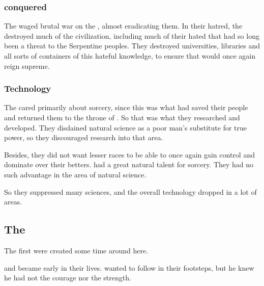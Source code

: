 \subsubsection{\Aryoth conquered}
The \dragons waged brutal war on the \aryothim, almost eradicating them. 
In their hatred, the \dragons destroyed much of the \aryoth civilization, including much of their hated  that had so long been a threat to the Serpentine peoples.
They destroyed universities, libraries and all sorts of containers of this hateful \aryoth knowledge, to ensure that \dragons would once again reign supreme. 





\subsubsection{Technology}
The \dragons cared primarily about sorcery, since this was what had saved their people and returned them to the throne of \Miith. 
So that was what they researched and developed. 
They disdained natural science as a poor man's substitute for true power, so they discouraged research into that area. 

Besides, they did not want lesser races to be able to once again gain control and dominate over their betters. 
\Dragons had a great natural talent for sorcery. 
They had no such advantage in the area of natural science. 

So they suppressed many sciences, and the overall technology dropped in a lot of areas. 












\subsection{The \shaeeroths}
The first \shaeeroth{} were created some time around here. 

\Nexagglachel{} and \Ishnaruchaefir{} became \shaeeroth{} early in their lives. 
\Secherdamon{} wanted to follow in their footsteps, but he knew he had not the courage nor the strength. 









